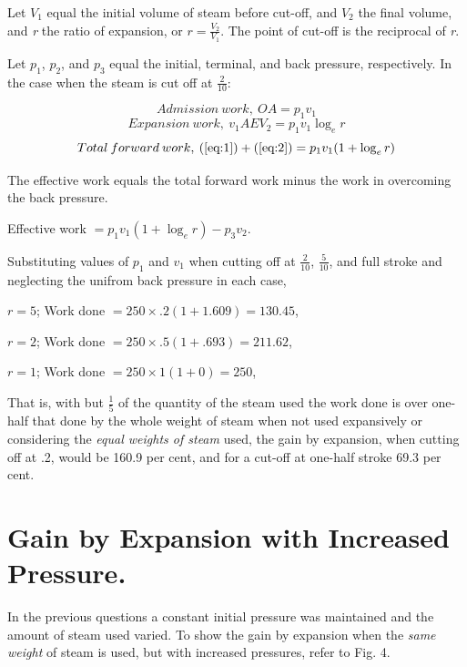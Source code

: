 \documentclass[11pt, a5paper]{book}
\begin{document}
Let $V_1$ equal the initial volume of steam before cut-off, and $V_2$
the final volume, and \textit{r} the ratio of expansion, or
$r=\frac{V_2}{V_1}$.  The point of cut-off is the reciprocal of
\textit{r}.\par

Let $p_1$, $p_2$, and $p_3$ equal the initial, terminal, and back
pressure, respectively.  In the case when the steam is cut off at
$\frac{2}{10}$:\par

\begin{equation} \label{eq:1}
  Admission\:work,\:OA = p_1 v_1
\end{equation}
\begin{equation} \label{eq:2}
  Expansion\:work,\: v_1 A E V_2 = p_1 v_1 \log_e{r}
\end{equation}
\begin{equation} \label{eq:3}
  Total\:forward\:work,\:(\ref{eq:1}) + (\ref{eq:2}) = p_1 v_1 (1 + \log_e{r})
\end{equation}

The effective work equals the total forward work minus the work in
overcoming the back pressure.\par

Effective work $ = p_1 v_1 (1 + \log_e{r}) - p_3 v_2$.\par

Substituting values of $p_1$ and $v_1$ when cutting off at
$\frac{2}{10}$, $\frac{5}{10}$, and full stroke and neglecting the
unifrom back pressure in each case,\par

$r=5$; Work done $= 250 \times .2 (1 + 1.609) = 130.45$,\par
$r=2$; Work done $= 250 \times .5 (1 + .693) = 211.62$,\par
$r=1$; Work done $= 250 \times 1 (1 + 0) = 250$,\par

That is, with but $\frac{1}{5}$ of the quantity of the steam used the
work done is over one-half that done by the whole weight of steam when
not used expansively or considering the \textit{equal weights of
  steam} used, the gain by expansion, when cutting off at .2, would be
160.9 per cent, and for a cut-off at one-half stroke 69.3 per
cent.\par

\section[Gain from Increased Pressure.]{Gain by Expansion with Increased Pressure.}In the previous
questions a constant initial pressure was maintained and the amount of
steam used varied.  To show the gain by expansion when the
\textit{same weight} of steam is used, but with increased pressures,
refer to Fig. 4.\par
\end{document}

